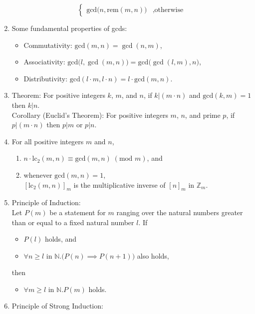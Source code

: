 \documentclass{article}
\begin{document}
\begin{enumerate}
$$\begin{cases}
            \text{gcd}\big(n,\text{rem}(m,n)\big) &, \text{otherwise}
        \end{cases}$$
    \item Some fundamental properties of gcds:
        \begin{itemize}[label={-},topsep=0pt]
            \item Commutativity: $\text{gcd}(m,n)=\gcd(n,m)$,
            \item Associativity: $\text{gcd}\big(l,\gcd(m,n)\big)=\text{gcd}\big(\gcd(l,m),n\big)$,
            \item Distributivity: $\text{gcd}(l\cdot m,l\cdot n)=l\cdot\text{gcd}(m,n)$.
        \end{itemize}
    \item Theorem: For positive integers $k$, $m$, and $n$, if $k|(m\cdot n)$ and $\text{gcd}(k,m)=1$ then $k|n$.\\
        Corollary (Euclid's Theorem): For positive integers $m$, $n$, and prime $p$, if $p|(m\cdot n)$ then $p|m$ or $p|n$.
    \item For all positive integers $m$ and $n$,
        \begin{enumerate}[label=(\arabic*),topsep=0pt]
            \item $n\cdot\text{lc}_2(m,n)\equiv\text{gcd}(m,n)\;(\text{mod }m)$, and
            \item whenever $\text{gcd}(m,n)=1$,\\
                $[\text{lc}_2(m,n)]_m$ is the multiplicative inverse of $[n]_m$ in $\mathbb{Z}_m$.
        \end{enumerate}
\newpage
    \item Principle of Induction:\\
        Let $P(m)$ be a statement for $m$ ranging over the natural numbers greater than or equal to a fixed natural number $l$. If 
        \begin{itemize}[label={-},topsep=0pt]
            \item $P(l)$ holds, and 
            \item $\forall n\geq l\text{ in }\mathbb{N}.\big(P(n)\implies P(n+1)\big)$ also holds,
        \end{itemize}
        then
        \begin{itemize}[label={-},topsep=0pt]
            \item $\forall m\geq l\text{ in }\mathbb{N}.P(m)$ holds.
        \end{itemize}
    \item Principle of Strong Induction:\\

\end{enumerate}
\end{document}
